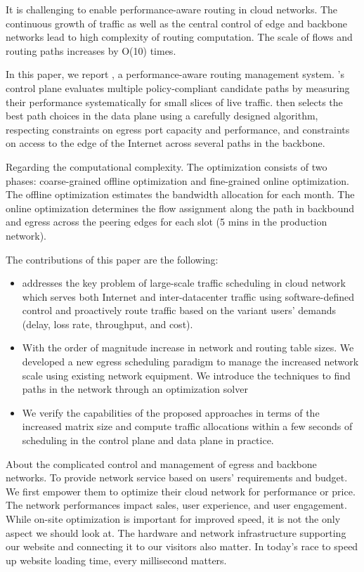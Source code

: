 It is challenging to enable performance-aware routing in cloud networks. The continuous growth of traffic as well as the central control of edge and backbone networks lead to high complexity of routing computation. The scale of flows and routing paths increases by O(10) times. %

In this paper, we report {\sys}, a performance-aware routing management system. {\sys}’s control plane evaluates multiple policy-compliant candidate paths by measuring their performance systematically for small slices of live traffic. {\sys} then selects the best path choices in the data plane using a carefully designed algorithm, respecting constraints on egress port capacity and performance, and constraints on access to the edge of the Internet across several paths in the backbone. 


Regarding the computational complexity. The optimization consists of two phases: coarse-grained offline optimization and fine-grained online optimization. The offline optimization estimates the bandwidth allocation for each month. The online optimization determines the flow assignment along the path in backbound and egress across the peering edges for each slot (5 mins in the production network).

The contributions of this paper are the following: 
\begin{itemize}[leftmargin=*] 
    \item {\sys} addresses the key problem of large-scale traffic scheduling in cloud network which serves both Internet and inter-datacenter traffic using software-defined control and proactively route traffic based on the variant users' demands (delay, loss rate, throughput, and cost). 
    \item  With the order of magnitude increase in network and routing table sizes. We developed a new egress scheduling paradigm to manage the increased network scale using existing network equipment. We introduce the techniques to find paths in the network through an optimization solver
    \item  We verify the capabilities of the proposed approaches in terms of the increased matrix size and compute traffic allocations within a few seconds of scheduling in the control plane and data plane in practice.
\end{itemize}

About the complicated control and management of egress and backbone networks. To provide network service based on users' requirements and budget. We first empower them to optimize their cloud network for performance or price. The network performances impact sales, user experience, and user engagement. While on-site optimization is important for improved speed, it is not the only aspect we should look at. The hardware and network infrastructure supporting our website and connecting it to our visitors also matter. In today’s race to speed up website loading time, every millisecond matters. 

